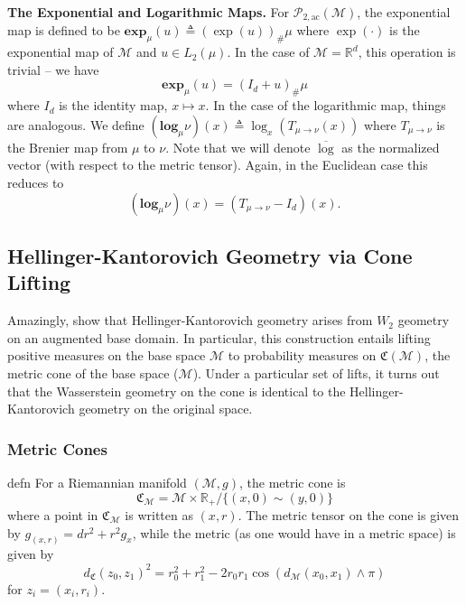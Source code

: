 \documentclass[11pt]{article}
\newcommand{\man}{\mathcal{M}}
\begin{document}
\noindent \textbf{The Exponential and Logarithmic Maps.} For $\mathcal{P}_{2, \text{ac}}(\man)$, the exponential map is defined to be $\mathbf{exp}_{\mu}(u) \triangleq (\exp(u))_\#\mu$ where $\exp(\cdot)$ is the exponential map of $\man$ and $u \in L_2(\mu)$. In the case of $\man = \mathbb{R}^d$, this operation is trivial -- we have
\begin{equation}\label{eq: wasserstein euclidean expmap}
    \mathbf{exp}_\mu(u) = (I_d + u)_\# \mu
\end{equation}
where $I_d$ is the identity map, $x \mapsto x$. In the case of the logarithmic map, things are analogous. We define $(\mathbf{log}_\mu\nu) (x) \triangleq \log_x(T_{\mu \rightarrow \nu}(x))$ where $T_{\mu \rightarrow \nu}$ is the Brenier map from $\mu$ to $\nu$. Note that we will denote $\overline{\log}$ as the normalized vector (with respect to the metric tensor). Again, in the Euclidean case this reduces to
\begin{equation}\label{eq: wasserstein euclidean logmap}
    (\mathbf{log}_\mu\nu )(x) = (T_{\mu \rightarrow \nu} - I_d)(x).
\end{equation}


\subsection{Hellinger-Kantorovich Geometry via Cone Lifting}

Amazingly, \citet{liero2016optimal} show that Hellinger-Kantorovich geometry arises from $W_2$ geometry on an augmented base domain. In particular, this construction entails lifting positive measures on the base space $\man$ to probability measures on $\mathfrak{C}(\man)$, the metric cone of the base space ($\man$). Under a particular set of lifts, it turns out that the Wasserstein geometry on the cone is identical to the Hellinger-Kantorovich geometry on the original space.

\subsubsection{Metric Cones}

\begin{restatable}{defn}{} \label{def: metric cone}
    For a Riemannian manifold $(\man, g)$, the metric cone is
    \[\mathfrak{C}_\man = \man \times \mathbb{R}_{+} / \{(x, 0) \sim (y, 0)\}\]
    where a point in $\mathfrak{C}_\man$ is written as $(x, r)$. The metric tensor on the cone is given by $g_{(x,r)} = dr^2 + r^2g_x$, while the metric (as one would have in a metric space) is given by 
    \begin{equation*}
    d_{\mathfrak{C}}(z_0, z_1)^2 = r_0^2 + r_1^2 - 2r_0r_1\cos(d_{\man}(x_0, x_1) \land \pi)
    \end{equation*}
    for $z_i = (x_i, r_i)$.
\end{restatable} 
\end{document}
